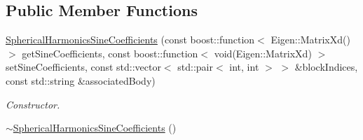 \subsection*{Public Member Functions}
\begin{DoxyCompactItemize}
\item 
\hyperlink{classtudat_1_1estimatable__parameters_1_1SphericalHarmonicsSineCoefficients_aaefb434de22cbb872a1d0d46f20520d8}{Spherical\+Harmonics\+Sine\+Coefficients} (const boost\+::function$<$ Eigen\+::\+Matrix\+Xd() $>$ get\+Sine\+Coefficients, const boost\+::function$<$ void(Eigen\+::\+Matrix\+Xd) $>$ set\+Sine\+Coefficients, const std\+::vector$<$ std\+::pair$<$ int, int $>$ $>$ \&block\+Indices, const std\+::string \&associated\+Body)
\begin{DoxyCompactList}\small\item\em Constructor. \end{DoxyCompactList}\item 
\hyperlink{classtudat_1_1estimatable__parameters_1_1SphericalHarmonicsSineCoefficients_adfab46c111df28d12d795e9de06c6649}{$\sim$\+Spherical\+Harmonics\+Sine\+Coefficients} ()\hypertarget{classtudat_1_1estimatable__parameters_1_1SphericalHarmonicsSineCoefficients_adfab46c111df28d12d795e9de06c6649}{}\label{classtudat_1_1estimatable__parameters_1_1SphericalHarmonicsSineCoefficients_adfab46c111df28d12d795e9de06c6649}


\end{DoxyCompactItemize}
